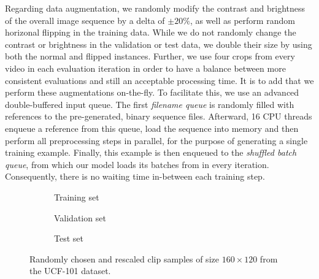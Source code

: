 Regarding data augmentation, we randomly modify the contrast and brightness of the overall image sequence by a delta of $ \pm20\% $, as well as perform random horizonal flipping in the training data. While we do not randomly change the contrast or brightness in the validation or test data, we double their size by using both the normal and flipped instances. Further, we use four crops from every video in each evaluation iteration in order to have a balance between more consistent evaluations and still an acceptable processing time. It is to add that we perform these augmentations on-the-fly. To facilitate this, we use an advanced double-buffered input queue. The first \textit{filename queue} is randomly filled with references to the pre-generated, binary sequence files. Afterward, \num{16} CPU threads enqueue a reference from this queue, load the sequence into memory and then perform all preprocessing steps in parallel, for the purpose of generating a single training example. Finally, this example is then enqueued to the \textit{shuffled batch queue}, from which our model loads its batches from in every iteration. Consequently, there is no waiting time in-between each training step.


\begin{figure}[htpb]
\centering
\begin{subfigure}{1.0\textwidth}
  \centering
  \caption{Training set}
  \label{fig:ucf_train_full}
  \vspace{.1cm}
\end{subfigure}
\begin{subfigure}{1.0\textwidth}
  \centering
  \caption{Validation set}
  \label{fig:ucf_valid_full}
  \vspace{.1cm}
\end{subfigure}
\begin{subfigure}{1.0\textwidth}
  \centering
  \caption{Test set}
  \label{fig:ucf_test_full}
\end{subfigure}
\caption[UCF-101 Full Image Samples]{Randomly chosen and rescaled clip samples of size $160 \times 120$ from the UCF-101 dataset.}
\label{fig:ucf_full}
\end{figure}
